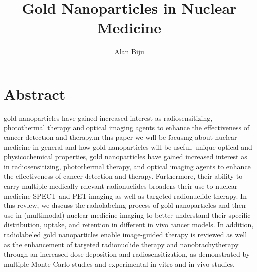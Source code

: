\documentclass{article}
\begin{document}
\title{Gold Nanoparticles in Nuclear Medicine }
\author{Alan Biju}


\maketitle


\section*{Abstract}

gold nanoparticles have gained increased interest as radiosensitizing, photothermal therapy and optical imaging agents to enhance the effectiveness of cancer detection and therapy.in this paper we will be focusing about nuclear medicine in general and how gold nanoparticles will be useful. unique optical and physicochemical properties, gold nanoparticles have gained increased interest as in radiosensitizing, photothermal therapy, and optical imaging agents to enhance the effectiveness of cancer detection and therapy. Furthermore, their ability to carry multiple medically relevant radionuclides broadens their use to nuclear medicine SPECT and PET imaging as well as targeted radionuclide therapy. In this review, we discuss the radiolabeling process of gold nanoparticles and their use in (multimodal) nuclear medicine imaging to better understand their specific distribution, uptake, and retention in different in vivo cancer models. In addition,
radiolabeled gold nanoparticles enable image-guided therapy is reviewed as well as the enhancement of targeted radionuclide therapy and nanobrachytherapy through an increased dose deposition and radiosensitization, as demonstrated by multiple Monte Carlo studies and experimental in vitro and in vivo studies.
\end{document}
